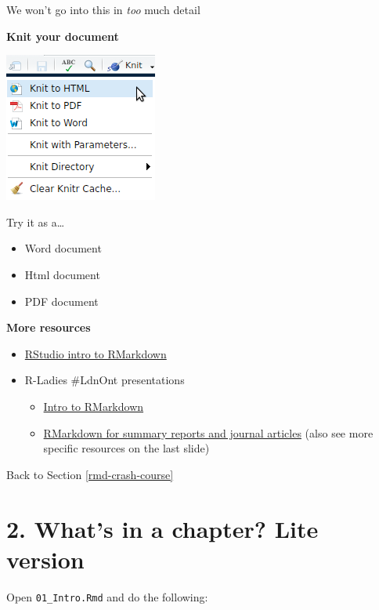 \documentclass[
  12pt,
  oneside]{book}
\providecommand{\tightlist}{%
  \setlength{\itemsep}{0pt}\setlength{\parskip}{0pt}}
\numberwithin{figure}{chapter}
\begin{document}
We won't go into this in \emph{too} much detail

\textbf{Knit your document}

\includegraphics{images/knit.png}

Try it as a\ldots{}

\begin{itemize}
\tightlist
\item
  Word document
\item
  Html document
\item
  PDF document
\end{itemize}

\textbf{More resources}

\begin{itemize}
\tightlist
\item
  \href{https://rmarkdown.rstudio.com/lesson-1.html}{RStudio intro to RMarkdown}
\item
  R-Ladies \#LdnOnt presentations

  \begin{itemize}
  \tightlist
  \item
    \href{https://github.com/rladies/meetup-presentations_london_ontario/tree/master/2017-03-04_Intro2RMarkdown}{Intro to RMarkdown}
  \item
    \href{https://github.com/rladies/meetup-presentations_london_ontario/tree/master/2018-03-06_rmarkdown}{RMarkdown for summary reports and journal articles} (also see more specific resources on the last slide)
  \end{itemize}
\end{itemize}

Back to Section \ref{rmd-crash-course}

\hypertarget{ex2}{%
\section{2. What's in a chapter? Lite version}\label{ex2}}

Open \texttt{01\_Intro.Rmd} and do the following:
\end{document}
